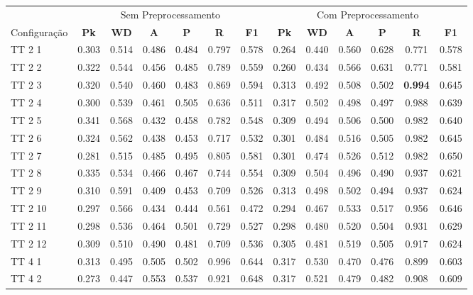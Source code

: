 \documentclass{article}
\begin{document}
 
\begin{tabular}{|l|c|c|c|c|c|c||c|c|c|c|c|c|} 
\hline 
&\multicolumn{6}{c||}{Sem Preprocessamento} & \multicolumn{6}{c|}{Com Preprocessamento}\\ 
Configuração & \textbf{Pk} & \textbf{WD} & \textbf{A } & \textbf{P } & \textbf{R } & \textbf{F1} & \textbf{Pk} & \textbf{WD} & \textbf{A } & \textbf{P } & \textbf{R } & \textbf{F1}\\ \hline
TT  2  1 & 0.303 & 0.514 & 0.486 & 0.484 & 0.797 & 0.578 & 0.264 & 0.440 & 0.560 & 0.628 & 0.771 & 0.578\\ \hline
TT  2  2 & 0.322 & 0.544 & 0.456 & 0.485 & 0.789 & 0.559 & 0.260 & 0.434 & 0.566 & 0.631 & 0.771 & 0.581\\ \hline
TT  2  3 & 0.320 & 0.540 & 0.460 & 0.483 & 0.869 & 0.594 & 0.313 & 0.492 & 0.508 & 0.502 & \textbf{0.994} & 0.645\\ \hline
TT  2  4 & 0.300 & 0.539 & 0.461 & 0.505 & 0.636 & 0.511 & 0.317 & 0.502 & 0.498 & 0.497 & 0.988 & 0.639\\ \hline
TT  2  5 & 0.341 & 0.568 & 0.432 & 0.458 & 0.782 & 0.548 & 0.309 & 0.494 & 0.506 & 0.500 & 0.982 & 0.640\\ \hline
TT  2  6 & 0.324 & 0.562 & 0.438 & 0.453 & 0.717 & 0.532 & 0.301 & 0.484 & 0.516 & 0.505 & 0.982 & 0.645\\ \hline
TT  2  7 & 0.281 & 0.515 & 0.485 & 0.495 & 0.805 & 0.581 & 0.301 & 0.474 & 0.526 & 0.512 & 0.982 & 0.650\\ \hline
TT  2  8 & 0.335 & 0.534 & 0.466 & 0.467 & 0.744 & 0.554 & 0.309 & 0.504 & 0.496 & 0.490 & 0.937 & 0.621\\ \hline
TT  2  9 & 0.310 & 0.591 & 0.409 & 0.453 & 0.709 & 0.526 & 0.313 & 0.498 & 0.502 & 0.494 & 0.937 & 0.624\\ \hline
TT  2 10 & 0.297 & 0.566 & 0.434 & 0.444 & 0.561 & 0.472 & 0.294 & 0.467 & 0.533 & 0.517 & 0.956 & 0.646\\ \hline
TT  2 11 & 0.298 & 0.536 & 0.464 & 0.501 & 0.729 & 0.527 & 0.298 & 0.480 & 0.520 & 0.504 & 0.931 & 0.629\\ \hline
TT  2 12 & 0.309 & 0.510 & 0.490 & 0.481 & 0.709 & 0.536 & 0.305 & 0.481 & 0.519 & 0.505 & 0.917 & 0.624\\ \hline
TT  4  1 & 0.313 & 0.495 & 0.505 & 0.502 & 0.996 & 0.644 & 0.317 & 0.530 & 0.470 & 0.476 & 0.899 & 0.603\\ \hline
TT  4  2 & 0.273 & 0.447 & 0.553 & 0.537 & 0.921 & 0.648 & 0.317 & 0.521 & 0.479 & 0.482 & 0.908 & 0.609\\ \hline

\end{tabular}
\end{document}
